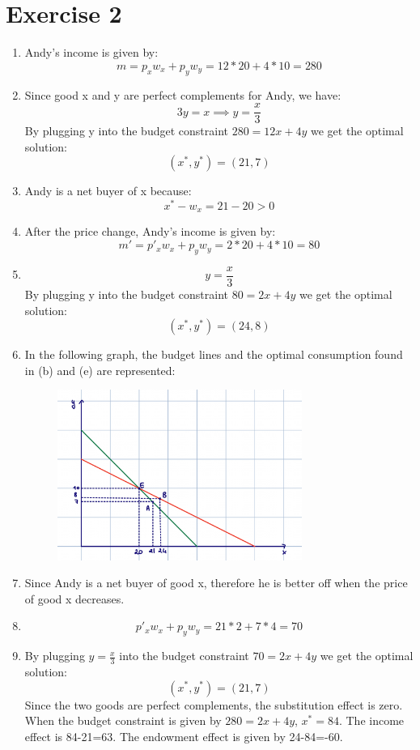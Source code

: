 \documentclass{article}
\begin{document}
\section*{Exercise 2}
\begin{enumerate}[label=(\alph*)]
\item Andy’s income is given by:
\[m=p_xw_x+p_yw_y=12*20+4*10=280\]
\item Since good x and y are perfect complements for Andy, we have:
\[3y=x \implies y= \frac{x}{3} \]
By plugging y into the budget constraint $280=12x+4y$ we get the optimal solution:
\[ (x^*, y^*)=(21,7)\]
\item Andy is a net buyer of x because:
\[x^*-w_x=21-20>0\]
\item After the price change, Andy’s income is given by:
\[m'=p'_xw_x+p_yw_y=2*20+4*10=80\]
\item \[ y =\frac{x}{3} \]
By plugging y into the budget constraint $80=2x+4y$ we get the optimal solution:
\[ (x^*, y^*)=(24,8)\]
\item In the following graph, the budget lines and the optimal consumption found in (b) and (e) are represented:
\begin{figure}[H]
    \centering
    \includegraphics[width=8cm]{fig2.png}
    \caption{}
    \label{fig:galaxy}
\end{figure}
\item Since Andy is a net buyer of good x, therefore he is better off when the price of good x decreases.
\item \[ p'_xw_x+p_yw_y=21*2+7*4=70\]
\item By plugging $y=\frac{x}{3}$ into the budget constraint $70=2x+4y$ we get the optimal solution:
\[ (x^*, y^*)=(21,7)\]
Since the two goods are perfect complements, the substitution effect is zero.
When the budget constraint is given by $280=2x+4y$, $x^*=84$.
The income effect is 84-21=63.
The endowment effect is given by 24-84=-60.
\end{enumerate}
\end{document}
